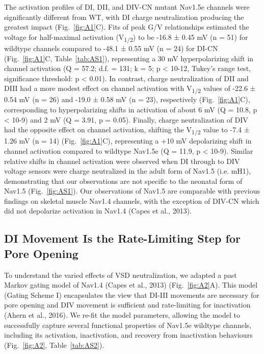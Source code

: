 The activation profiles of DI, DII, and DIV-CN mutant Nav1.5e channels were significantly different from WT, with DI charge neutralization producing the greatest impact (Fig.~\ref{fig:A1}C). Fits of peak G/V relationships estimated the voltage for half-maximal activation (V\textsubscript{1/2}) to be -16.8 ± 0.45 mV (n = 51) for wildtype channels compared to -48.1 ± 0.55 mV (n = 24) for DI-CN (Fig.~\ref{fig:A1}C, Table~\ref{tab:AS1}), representing a 30 mV hyperpolarizing shift in channel activation (Q = 57.2; d.f. = 131; k = 5; p < 10-12, Tukey’s range test, significance threshold: p < 0.01). In contrast, charge neutralization of DII and DIII had a more modest effect on channel activation with V\textsubscript{1/2} values of -22.6 ± 0.54 mV (n = 26) and -19.0 ± 0.58 mV (n = 23), respectively (Fig.~\ref{fig:A1}C), corresponding to hyperpolarizing shifts in activation of about 6 mV (Q = 10.8, p < 10-9) and 2 mV (Q = 3.91, p = 0.05). Finally, charge neutralization of DIV had the opposite effect on channel activation, shifting the V\textsubscript{1/2} value to -7.4 ± 1.26 mV (n = 14) (Fig.~\ref{fig:A1}C), representing a +10 mV depolarizing shift in channel activation compared to wildtype Nav1.5e (Q = 11.9, p < 10-9). Similar relative shifts in channel activation were observed when DI through to DIV voltage sensors were charge neutralized in the adult form of Nav1.5 (i.e. mH1), demonstrating that our observations are not specific to the neonatal form of Nav1.5 (Fig.~\ref{fig:AS1}). Our observations of Nav1.5 are comparable with previous findings on skeletal muscle Nav1.4 channels, with the exception of DIV-CN which did not depolarize activation in Nav1.4 (Capes et al., 2013).

\subsection{DI Movement Is the Rate-Limiting Step for Pore Opening}
To understand the varied effects of VSD neutralization, we adapted a past Markov gating model of Nav1.4 (Capes et al., 2013) (Fig.~\ref{fig:A2}A). This model (Gating Scheme I) encapsulates the view that DI-III movements are necessary for pore opening and DIV movement is sufficient and rate-limiting for inactivation (Ahern et al., 2016). We re-fit the model parameters, allowing the model to successfully capture several functional properties of Nav1.5e wildtype channels, including its activation, inactivation, and recovery from inactivation behaviours (Fig.~\ref{fig:A2}, Table~\ref{tab:AS2}). 


